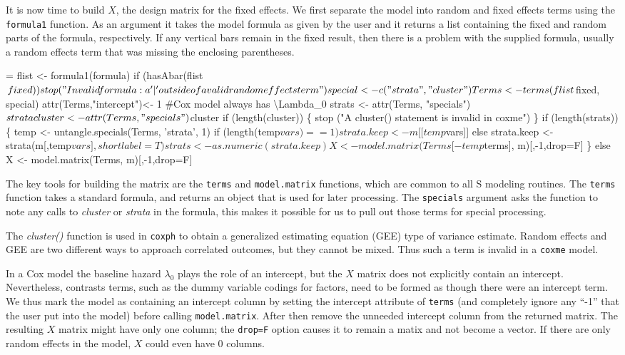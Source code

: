 \documentclass{article}
\begin{document}
It is now time to build $X$, the design matrix for the fixed effects.
We first separate the model into random and fixed effects terms
using the \Verb!formula1! function.
As an argument it takes the model formula as given by the user
and it returns a list containing the fixed and random parts of
the formula, respectively.
If any vertical bars remain in the fixed result, then there is
a problem with the supplied formula, 
usually a random effects term that was missing the enclosing
parentheses.
\begin{nwchunk}
=
     flist <- formula1(formula)
     if (hasAbar(flist$fixed))
         stop("Invalid formula: a '|' outside of a valid random effects term")
 
     special <- c("strata", "cluster")
     Terms <- terms(flist$fixed, special)
     attr(Terms,"intercept")<- 1  #Cox model always has {\textbackslash}Lambda_0
     strats <- attr(Terms, "specials")$strata
     cluster<- attr(Terms, "specials")$cluster
     if (length(cluster)) \{
         stop ("A cluster() statement is invalid in coxme")
         \}
     if (length(strats)) \{
         temp <- untangle.specials(Terms, 'strata', 1)
         if (length(temp$vars)==1) strata.keep <- m[[temp$vars]]
         else strata.keep <- strata(m[,temp$vars], shortlabel=T)
         strats <- as.numeric(strata.keep)
         X <- model.matrix(Terms[-temp$terms], m)[,-1,drop=F]
         \}
     else X <- model.matrix(Terms, m)[,-1,drop=F]
 
 
\end{nwchunk}
The key tools for building the matrix are the \Verb!terms! and \Verb?model.matrix?
functions, which are common to all S modeling routines.
The \Verb!terms! function takes a standard formula, and returns an object that
is used for later processing.
The \Verb!specials! argument asks the function to note any calls to
\emph{cluster} or \emph{strata} in the formula, this makes it possible
for us to pull out those terms for special processing.

The \emph{cluster()} function is used in \Verb!coxph! to
obtain a generalized estimating equation (GEE) type of variance estimate.
Random effects and GEE are two different ways to approach
correlated outcomes, but they cannot be mixed.  
Thus such a term is invalid in a \Verb!coxme! model.

In a Cox model the baseline hazard $\lambda_0$ plays the role of an
intercept, but the $X$ matrix does not explicitly contain an intercept.
Nevertheless, contrasts terms, such as the dummy variable codings for
factors, need to be formed as though there were an intercept term.
We thus mark the model as containing an intercept column by setting the
intercept attribute of \Verb!terms! (and completely ignore any ``-1'' that
the user put into the model) before calling \Verb!model.matrix!.
After then remove the unneeded intercept column from the returned
matrix.  
The resulting $X$ matrix might have only one column; the \Verb!drop=F!
option causes it to remain a matix and not become a vector.
If there are only random effects in the model, $X$ could even have 0
columns.
\end{document}
